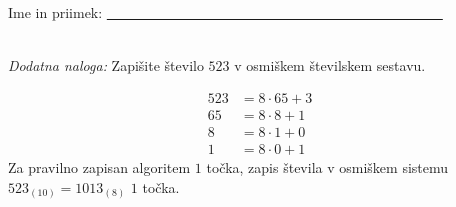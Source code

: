 \documentclass[addpoints]{exam}
\begin{document}
\begin{questions}
\begin{parts}
    
    

        \end{parts}








     \newpage

     \noindent Ime in priimek: \underline{~~~~~~~~~~~~~~~~~~~~~~~~~~~~~~~~~~~~~~~~~~~~~~~~}

     ~\\

    \bonusquestion[2]
    \textit{Dodatna naloga:} Zapišite število $523$ v osmiškem številskem sestavu.

    \begin{solution}[7cm]
        \begin{align*}
            523 &= 8\cdot 65 + 3 \\
            65 &= 8\cdot 8 + 1 \\
            8 &= 8\cdot 1 + 0 \\
            1 &= 8\cdot 0 + 1
        \end{align*}
        Za pravilno zapisan algoritem $1$ točka, zapis števila v osmiškem sistemu $523_{(10)}=1013_{(8)}$ $1$ točka.
    \end{solution}





\end{questions}
\end{document}
